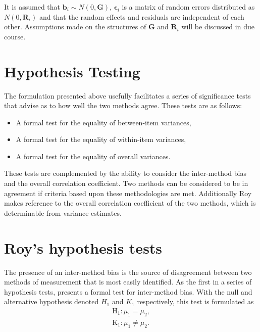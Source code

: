 \documentclass[12pt, a4paper]{report}
\theoremstyle{plain}
\theoremstyle{definition}
\theoremstyle{remark}
\begin{document}
It is assumed that $\boldsymbol{b}_i \sim N(0,\boldsymbol{G})$,
$\boldsymbol{\epsilon}_i$ is a matrix of random errors distributed as $N(0,\boldsymbol{R}_i)$ and
that the random effects and residuals are independent of each other. Assumptions made on the structures of $\boldsymbol{G}$ and $\boldsymbol{R}_i$ will be discussed in due course.

\newpage



\newpage
\section{Hypothesis Testing}
The formulation presented above usefully facilitates a series of
significance tests that advise as to how well the two methods
agree. These tests are as follows:
\begin{itemize}
	\item A formal test for the equality of between-item variances,
	\item A formal test for the equality of within-item variances,
	\item A formal test for the equality of overall variances.
\end{itemize}
These tests are complemented by the ability to consider the inter-method bias and the overall correlation coefficient. Two methods can be considered to be in agreement if criteria based upon these methodologies are met. Additionally Roy makes reference to the overall correlation coefficient of the two methods, which is determinable from variance estimates.

\section{Roy's hypothesis tests}
The presence of an inter-method bias is the source of disagreement between two methods of measurement that is most easily identified. As the first in a series of hypothesis tests, \citet{roy} presents a formal test for inter-method bias. With the null and alternative hypothesis denoted $H_1$ and $K_1$ respectively, this test is formulated as
\begin{eqnarray*}
	\operatorname{H_1} : \mu_1 = \mu_2 ,\\
	\operatorname{K_1} : \mu_1 \neq \mu_2.
\end{eqnarray*}
\end{document}
